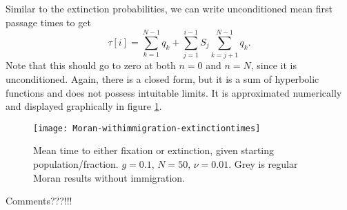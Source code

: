 Similar to the extinction probabilities, we can write unconditioned mean first passage times to get
\begin{equation}
\tau[i] = \sum_{k=1}^{N-1}q_k + \sum_{j=1}^{i-1}S_{j}\sum_{k=j+1}^{N-1}q_k. 
\end{equation}
Note that this should go to zero at both $n=0$ and $n=N$, since it is unconditioned. 
Again, there is a closed form, but it is a sum of hyperbolic functions and does not possess intuitable limits. 
It is approximated numerically and displayed graphically in figure \ref{extntimefig}. 
\begin{figure}[ht]
	\centering
	\texttt{[image: Moran-withimmigration-extinctiontimes]}
	\caption{Mean time to either fixation or extinction, given starting population/fraction. $g=0.1$, $N=50$, $\nu=0.01$. Grey is regular Moran results without immigration. } \label{extntimefig}
\end{figure}
Comments???!!!

